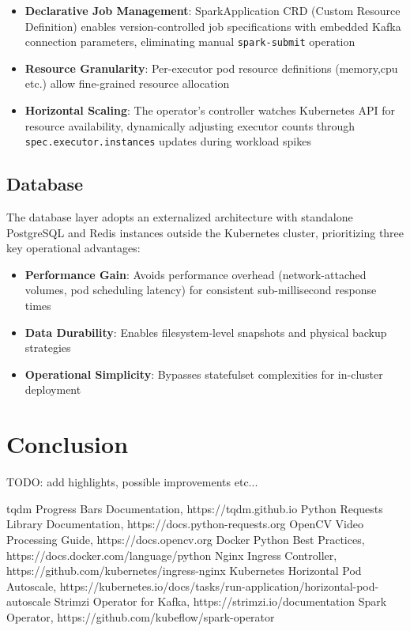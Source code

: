 \documentclass[10pt,a4paper]{article}
\begin{document}
\begin{itemize}
    \item \textbf{Declarative Job Management}: SparkApplication CRD (Custom Resource Definition) enables version-controlled job specifications with embedded Kafka connection parameters, eliminating manual \texttt{spark-submit} operation
    \item \textbf{Resource Granularity}: Per-executor pod resource definitions (memory,cpu etc.) allow fine-grained resource allocation
    \item \textbf{Horizontal Scaling}: The operator's controller watches Kubernetes API for resource availability, dynamically adjusting executor counts through \texttt{spec.executor.instances} updates during workload spikes
\end{itemize}

\subsection{Database}
The database layer adopts an externalized architecture with standalone PostgreSQL and Redis instances outside the Kubernetes cluster, prioritizing three key operational advantages:

\begin{itemize}
    \item \textbf{Performance Gain}: Avoids performance overhead (network-attached volumes, pod scheduling latency) for consistent sub-millisecond response times
    \item \textbf{Data Durability}: Enables filesystem-level snapshots and physical backup strategies
    \item \textbf{Operational Simplicity}: Bypasses statefulset complexities for in-cluster deployment
\end{itemize}

\section{Conclusion}

TODO: add highlights, possible improvements etc...

\begin{thebibliography}{9}
     tqdm Progress Bars Documentation, https://tqdm.github.io
     Python Requests Library Documentation, https://docs.python-requests.org
     OpenCV Video Processing Guide, https://docs.opencv.org
     Docker Python Best Practices, https://docs.docker.com/language/python
     Nginx Ingress Controller, https://github.com/kubernetes/ingress-nginx
     Kubernetes Horizontal Pod Autoscale, https://kubernetes.io/docs/tasks/run-application/horizontal-pod-autoscale
     Strimzi Operator for Kafka, https://strimzi.io/documentation
     Spark Operator, https://github.com/kubeflow/spark-operator
\end{thebibliography}
\end{document}
